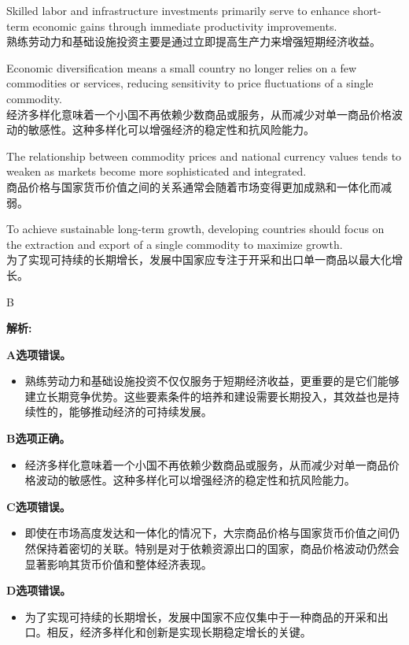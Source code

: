 \documentclass{article}
\newenvironment{explanation}
{\textbf{解析:}\par}
{\par}
\begin{document}
\begin{choices}
    \item Skilled labor and infrastructure investments primarily serve to enhance short-term economic gains through immediate productivity improvements.\\ 
    熟练劳动力和基础设施投资主要是通过立即提高生产力来增强短期经济收益。
    \item Economic diversification means a small country no longer relies on a few commodities or services, reducing sensitivity to price fluctuations of a single commodity.\\ 
    经济多样化意味着一个小国不再依赖少数商品或服务，从而减少对单一商品价格波动的敏感性。这种多样化可以增强经济的稳定性和抗风险能力。
    \item The relationship between commodity prices and national currency values tends to weaken as markets become more sophisticated and integrated.\\ 
    商品价格与国家货币价值之间的关系通常会随着市场变得更加成熟和一体化而减弱。
    \item To achieve sustainable long-term growth, developing countries should focus on the extraction and export of a single commodity to maximize growth.\\ 
    为了实现可持续的长期增长，发展中国家应专注于开采和出口单一商品以最大化增长。
\end{choices}

\begin{correctanswer}
    B
\end{correctanswer}

\begin{explanation}
    \textbf{A选项错误。}
    \begin{itemize}
        \item 熟练劳动力和基础设施投资不仅仅服务于短期经济收益，更重要的是它们能够建立长期竞争优势。这些要素条件的培养和建设需要长期投入，其效益也是持续性的，能够推动经济的可持续发展。
    \end{itemize}

    \textbf{B选项正确。}
    \begin{itemize}
        \item 经济多样化意味着一个小国不再依赖少数商品或服务，从而减少对单一商品价格波动的敏感性。这种多样化可以增强经济的稳定性和抗风险能力。
    \end{itemize}

    \textbf{C选项错误。}
    \begin{itemize}
        \item 即使在市场高度发达和一体化的情况下，大宗商品价格与国家货币价值之间仍然保持着密切的关联。特别是对于依赖资源出口的国家，商品价格波动仍然会显著影响其货币价值和整体经济表现。
    \end{itemize}

    \textbf{D选项错误。}
    \begin{itemize}
        \item 为了实现可持续的长期增长，发展中国家不应仅集中于一种商品的开采和出口。相反，经济多样化和创新是实现长期稳定增长的关键。
    \end{itemize}
\end{explanation}
\end{document}
